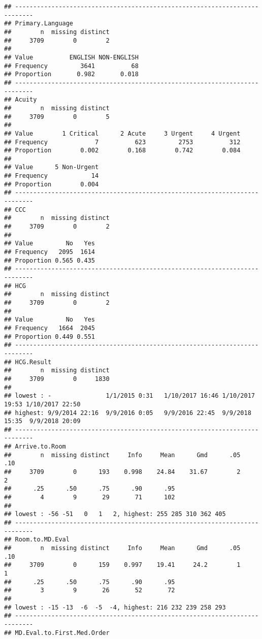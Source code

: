 \documentclass[]{article}
\begin{document}
\begin{verbatim}
## ---------------------------------------------------------------------------
## Primary.Language 
##        n  missing distinct 
##     3709        0        2 
##                                   
## Value          ENGLISH NON-ENGLISH
## Frequency         3641          68
## Proportion       0.982       0.018
## ---------------------------------------------------------------------------
## Acuity 
##        n  missing distinct 
##     3709        0        5 
##                                                               
## Value        1 Critical      2 Acute     3 Urgent     4 Urgent
## Frequency             7          623         2753          312
## Proportion        0.002        0.168        0.742        0.084
##                        
## Value      5 Non-Urgent
## Frequency            14
## Proportion        0.004
## ---------------------------------------------------------------------------
## CCC 
##        n  missing distinct 
##     3709        0        2 
##                       
## Value         No   Yes
## Frequency   2095  1614
## Proportion 0.565 0.435
## ---------------------------------------------------------------------------
## HCG 
##        n  missing distinct 
##     3709        0        2 
##                       
## Value         No   Yes
## Frequency   1664  2045
## Proportion 0.449 0.551
## ---------------------------------------------------------------------------
## HCG.Result 
##        n  missing distinct 
##     3709        0     1830 
## 
## lowest : -               1/1/2015 0:31   1/10/2017 16:46 1/10/2017 19:53 1/10/2017 22:50
## highest: 9/9/2014 22:16  9/9/2016 0:05   9/9/2016 22:45  9/9/2018 15:35  9/9/2018 20:09 
## ---------------------------------------------------------------------------
## Arrive.to.Room 
##        n  missing distinct     Info     Mean      Gmd      .05      .10 
##     3709        0      193    0.998    24.84    31.67        2        2 
##      .25      .50      .75      .90      .95 
##        4        9       29       71      102 
## 
## lowest : -56 -51   0   1   2, highest: 255 285 310 362 405
## ---------------------------------------------------------------------------
## Room.to.MD.Eval 
##        n  missing distinct     Info     Mean      Gmd      .05      .10 
##     3709        0      159    0.997    19.41     24.2        1        1 
##      .25      .50      .75      .90      .95 
##        3        9       26       52       72 
## 
## lowest : -15 -13  -6  -5  -4, highest: 216 232 239 258 293
## ---------------------------------------------------------------------------
## MD.Eval.to.First.Med.Order 

\end{verbatim}
\end{document}
